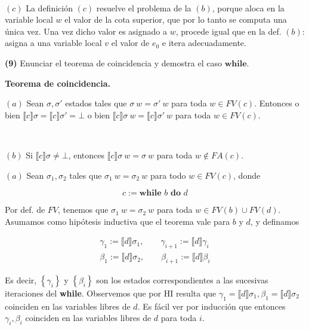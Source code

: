 \documentclass[a4paper, 12pt]{article}
\begin{document}
~

$(c)$ La definición $(c)$ resuelve el problema de la $(b)$, porque aloca en la
variable local $w$ el valor de la cota superior, que por lo tanto se computa una
única vez. Una vez dicho valor es asignado a $w$, procede igual que en la def.
$(b)$: asigna a una variable local $v$ el valor de $e_0$ e itera adecuadamente.

\pagebreak 

\begin{myframe}
  \textbf{(9)} Enunciar el teorema de coincidencia  y demostra el caso $\textbf{while}$.
\end{myframe}

\begin{helpframe}
  \textbf{Teorema de coincidencia.} 

  $(a)$ Sean $\sigma, \sigma'$ estados tales
  que $\sigma ~ w = \sigma' ~ w$ para toda $w \in FV(c)$. Entonces o bien 
  $\llbracket c \rrbracket\sigma = \llbracket c \rrbracket\sigma' = \bot $ o
  bien 
  $\llbracket c \rrbracket\sigma ~ w = \llbracket c \rrbracket\sigma' ~ w$ para
  toda $w \in FV(c)$.

  ~

  $(b)$ Si $\llbracket c \rrbracket\sigma \neq \bot $, entonces $\llbracket c
  \rrbracket\sigma ~ w = \sigma ~ w$ para toda $w \not\in  FA(c)$.
\end{helpframe}


$(a)$ Sean $\sigma_1, \sigma_2$ tales que $\sigma_1 ~ w = \sigma_2 ~ w$ para
todo $w \in FV(c)$, donde 

\begin{equation*} c := \textbf{while } b \textbf{ do } d \end{equation*}

Por def. de $FV$, tenemos que $\sigma_1 ~ w = \sigma_2 ~ w$ para toda $w \in
FV(b) \cup FV(d)$. Asumamos como hipótesis inductiva que el teorema vale para
$b$ y $d$, y definamos


\begin{align*}
  \gamma_1 := \llbracket d \rrbracket\sigma_1, \qquad \gamma_{i+1} := \llbracket d
  \rrbracket\gamma_i\\
  \beta_1 := \llbracket d \rrbracket\sigma_2, \qquad \beta_{i+1} := \llbracket d
  \rrbracket\beta_i
\end{align*}

Es decir, $\left\{ \gamma_i \right\} $ y $\left\{ \beta_i \right\} $ son los
estados correspondientes a las sucesivas iteraciones del \textbf{while}.
Observemos que por HI resulta que $\gamma_1 = \llbracket d \rrbracket\sigma_1,
\beta_1 = \llbracket d \rrbracket\sigma_2$ coinciden en las variables libres de
$d$. Es fácil ver por inducción que entonces $\gamma_i, \beta_i$ coinciden en
las variables libres de $d$ para toda $i$.
\end{document}
